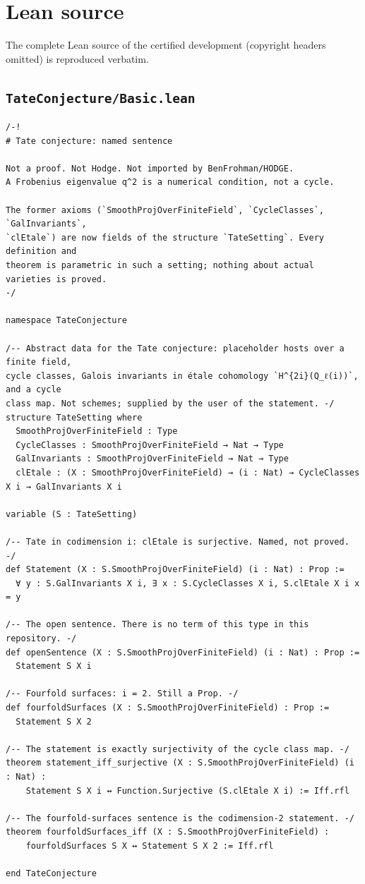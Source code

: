 \documentclass[11pt]{amsart}
\theoremstyle{definition}
\theoremstyle{remark}
\begin{document}
\appendix
\section{Lean source}
The complete Lean source of the certified development (copyright headers omitted) is reproduced verbatim.
\subsection*{\texttt{TateConjecture/Basic.lean}}
\begin{verbatim}
/-!
# Tate conjecture: named sentence

Not a proof. Not Hodge. Not imported by BenFrohman/HODGE.
A Frobenius eigenvalue q^2 is a numerical condition, not a cycle.

The former axioms (`SmoothProjOverFiniteField`, `CycleClasses`, `GalInvariants`,
`clEtale`) are now fields of the structure `TateSetting`. Every definition and
theorem is parametric in such a setting; nothing about actual varieties is proved.
-/

namespace TateConjecture

/-- Abstract data for the Tate conjecture: placeholder hosts over a finite field,
cycle classes, Galois invariants in étale cohomology `H^{2i}(Q_ℓ(i))`, and a cycle
class map. Not schemes; supplied by the user of the statement. -/
structure TateSetting where
  SmoothProjOverFiniteField : Type
  CycleClasses : SmoothProjOverFiniteField → Nat → Type
  GalInvariants : SmoothProjOverFiniteField → Nat → Type
  clEtale : (X : SmoothProjOverFiniteField) → (i : Nat) → CycleClasses X i → GalInvariants X i

variable (S : TateSetting)

/-- Tate in codimension i: clEtale is surjective. Named, not proved. -/
def Statement (X : S.SmoothProjOverFiniteField) (i : Nat) : Prop :=
  ∀ y : S.GalInvariants X i, ∃ x : S.CycleClasses X i, S.clEtale X i x = y

/-- The open sentence. There is no term of this type in this repository. -/
def openSentence (X : S.SmoothProjOverFiniteField) (i : Nat) : Prop :=
  Statement S X i

/-- Fourfold surfaces: i = 2. Still a Prop. -/
def fourfoldSurfaces (X : S.SmoothProjOverFiniteField) : Prop :=
  Statement S X 2

/-- The statement is exactly surjectivity of the cycle class map. -/
theorem statement_iff_surjective (X : S.SmoothProjOverFiniteField) (i : Nat) :
    Statement S X i ↔ Function.Surjective (S.clEtale X i) := Iff.rfl

/-- The fourfold-surfaces sentence is the codimension-2 statement. -/
theorem fourfoldSurfaces_iff (X : S.SmoothProjOverFiniteField) :
    fourfoldSurfaces S X ↔ Statement S X 2 := Iff.rfl

end TateConjecture
\end{verbatim}
\end{document}
